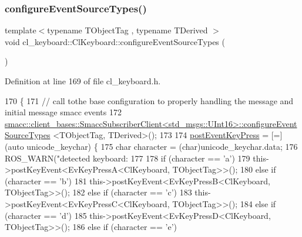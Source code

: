\subsubsection{\texorpdfstring{configure\+Event\+Source\+Types()}{configureEventSourceTypes()}}
{\footnotesize\ttfamily template$<$typename T\+Object\+Tag , typename T\+Derived $>$ \\
void cl\+\_\+keyboard\+::\+Cl\+Keyboard\+::configure\+Event\+Source\+Types (\begin{DoxyParamCaption}{ }\end{DoxyParamCaption})\hspace{0.3cm}{\ttfamily [inline]}}



Definition at line 169 of file cl\+\_\+keyboard.\+h.


\begin{DoxyCode}
170         \{
171                 \textcolor{comment}{// call tothe base configuration to properly handling the message and initial message smacc
       events}
172                 
      \hyperlink{classsmacc_1_1client__bases_1_1SmaccSubscriberClient}{smacc::client\_bases::SmaccSubscriberClient<std\_msgs::UInt16>::configureEventSourceTypes}
      <TObjectTag, TDerived>();
173 
174                 \hyperlink{classcl__keyboard_1_1ClKeyboard_ae9811fd50207ba9b69a4f27e7f8b4e86}{postEventKeyPress} = [=](\textcolor{keyword}{auto} unicode\_keychar) \{
175                         \textcolor{keywordtype}{char} character = (char)unicode\_keychar.data;
176                         ROS\_WARN(\textcolor{stringliteral}{"detected keyboard: %
177 
178                         \textcolor{keywordflow}{if} (character == \textcolor{charliteral}{'a'})
179                                 this->postKeyEvent<EvKeyPressA<ClKeyboard, TObjectTag>>();
180                         \textcolor{keywordflow}{else} \textcolor{keywordflow}{if} (character == \textcolor{charliteral}{'b'})
181                                 this->postKeyEvent<EvKeyPressB<ClKeyboard, TObjectTag>>();
182                         \textcolor{keywordflow}{else} \textcolor{keywordflow}{if} (character == \textcolor{charliteral}{'c'})
183                                 this->postKeyEvent<EvKeyPressC<ClKeyboard, TObjectTag>>();
184                         \textcolor{keywordflow}{else} \textcolor{keywordflow}{if} (character == \textcolor{charliteral}{'d'})
185                                 this->postKeyEvent<EvKeyPressD<ClKeyboard, TObjectTag>>();
186                         \textcolor{keywordflow}{else} \textcolor{keywordflow}{if} (character == \textcolor{charliteral}{'e'})
}
\end{DoxyCode}

